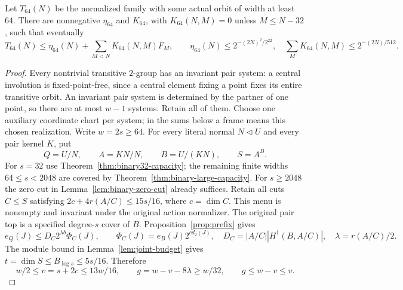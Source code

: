 \begin{theorem}\label{thm:binary-unbounded}
Let $T_{64}(N)$ be the normalized family with some actual orbit of
width at least $64$. There are nonnegative $\eta_{64}$ and $K_{64}$,
with $K_{64}(N,M)=0$ unless $M\leq N-32$, such that eventually
\begin{equation}\label{eq:binary-unbounded}
 T_{64}(N)\leq\eta_{64}(N)+\sum_{M<N}K_{64}(N,M)F_M,
 \qquad \eta_{64}(N)\leq2^{-(2N)^2/2^{22}},\quad
 \sum_MK_{64}(N,M)\leq2^{-(2N)/512}.
\end{equation}
\end{theorem}
\begin{proof}
Every nontrivial transitive $2$-group has an invariant pair system:
a central involution is fixed-point-free, since a central element
fixing a point fixes its entire transitive orbit. An invariant pair
system is determined by the partner of one point, so there are at
most $w-1$ systems. Retain all of them.
Choose one auxiliary coordinate chart per system; in the sums below
a frame means this chosen realization.
Write $w=2s\geq64$. For every literal normal $N\lhd U$ and every
pair kernel $K$, put
\[
 Q=U/N,\qquad A=KN/N,\qquad B=U/(KN),\qquad S=A^B.
\]
For $s=32$ use Theorem~\ref{thm:binary32-capacity}; the remaining
finite widths $64\leq s<2048$ are covered by
Theorem~\ref{thm:binary-large-capacity}. For $s\geq2048$ the zero
cut in Lemma~\ref{lem:binary-zero-cut} already suffices.
Retain all cuts $C\leq S$ satisfying
$2c+4r(A/C)\leq15s/16$, where $c=\dim C$.
This menu is nonempty and invariant under the original action
normalizer. The original pair top is a specified degree-$s$ cover of
$B$. Proposition~\ref{prop:prefix} gives
\[
 e_Q(J)\leq D_C2^{\lambda b}\Phi_C(J),\qquad
 \Phi_C(J)=e_B(J)2^{c d_2(J)},\quad
 D_C=|A/C||H^1(B,A/C)|,\quad\lambda=r(A/C)/2.
\]
The module bound in Lemma~\ref{lem:joint-budget} gives
$t=\dim S\leq B_{\log s}\leq5s/16$. Therefore
\begin{equation}\label{eq:binary-wide-parameters}
 w/2\leq v=s+2c\leq13w/16,\qquad
 g=w-v-8\lambda\geq w/32,\qquad g\leq w-v\leq v.
\end{equation}


\end{proof}
